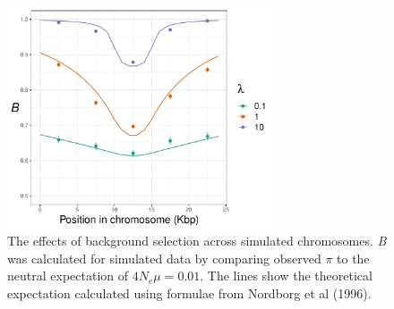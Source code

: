 \documentclass[10pt,twoside, twocolumn]{GSA_format}
\begin{document}
\begin{figure}[h]
\includegraphics[width=0.7\textwidth]{../TheoreticalExpectation/B_fixed_plot}
\caption{The effects of background selection across simulated chromosomes. \textit{B} was calculated for simulated data by comparing observed $\pi$ to the neutral expectation of $4N_e\mu=0.01$. The lines show the theoretical expectation calculated using formulae from Nordborg et al (1996).}
\label{fig:BGS_fixed_plot}
\end{figure}
\end{document}
